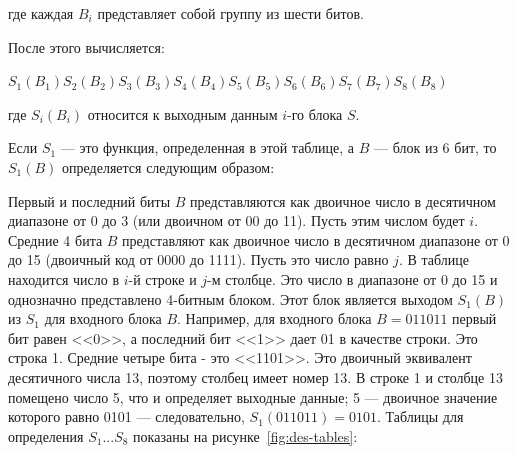 где каждая $B_i$ представляет собой группу из шести битов. 

После этого вычисляется:

$S_1(B_1)S_2(B_2)S_3(B_3)S_4(B_4)S_5(B_5)S_6(B_6)S_7(B_7)S_8(B_8)$

где $S_i(B_i)$ относится к выходным данным $i$-го блока $S$.

Если $S_1$ --- это функция, определенная в этой таблице, а $B$ --- блок из 6 бит, то $S_1(B)$ определяется следующим образом: 

Первый и последний биты $B$ представляются как двоичное число в десятичном диапазоне от 0 до 3 (или двоичном от 00 до 11). 
Пусть этим числом будет $i$. 
Средние 4 бита $B$ представляют как двоичное число в десятичном диапазоне от 0 до 15 (двоичный код от 0000 до 1111). 
Пусть это число равно $j$. 
В таблице находится число в $i$-й строке и $j$-м столбце. 
Это число в диапазоне от 0 до 15 и однозначно представлено 4-битным блоком. 
Этот блок является выходом $S_1(B)$ из $S_1$ для входного блока $B$. 
Например, для входного блока $B = 011011$ первый бит равен <<0>>, а последний бит <<1>> дает 01 в качестве строки. 
Это строка 1. 
Средние четыре бита - это <<1101>>. 
Это двоичный эквивалент десятичного числа 13, поэтому столбец имеет номер 13. 
В строке 1 и столбце 13 помещено число 5, что и определяет выходные данные; 5 --- двоичное значение которого равно 0101 --- следовательно, $S_1(011011) = 0101$.
Таблицы для определения $S_1 ... S_8$ показаны на рисунке~\ref{fig:des-tables}:

